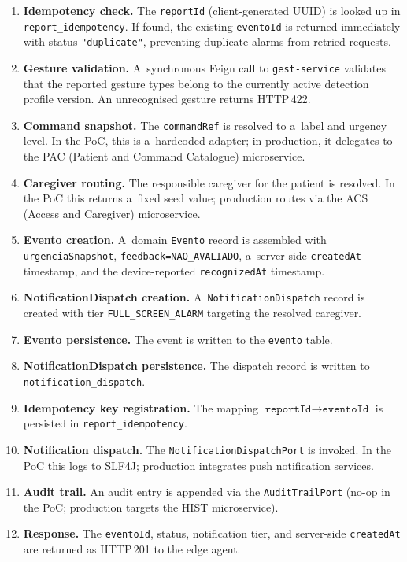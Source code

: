 \begin{enumerate}
  \item \textbf{Idempotency check.} The \texttt{reportId} (client-generated UUID) is
    looked up in \texttt{report\_idempotency}. If found, the existing \texttt{eventoId}
    is returned immediately with status \texttt{"duplicate"}, preventing duplicate alarms
    from retried requests.
  \item \textbf{Gesture validation.} A~synchronous Feign call to \texttt{gest-service}
    validates that the reported gesture types belong to the currently active detection
    profile version. An unrecognised gesture returns HTTP\,422.
  \item \textbf{Command snapshot.} The \texttt{commandRef} is resolved to a~label and
    urgency level. In the PoC, this is a~hardcoded adapter; in production, it delegates
    to the PAC (Patient and Command Catalogue) microservice.
  \item \textbf{Caregiver routing.} The responsible caregiver for the patient is
    resolved. In the PoC this returns a~fixed seed value; production routes via the ACS
    (Access and Caregiver) microservice.
  \item \textbf{Evento creation.} A~domain \texttt{Evento} record is assembled with
    \texttt{urgenciaSnapshot}, \texttt{feedback=NAO\_AVALIADO}, a~server-side
    \texttt{createdAt} timestamp, and the device-reported \texttt{recognizedAt}
    timestamp.
  \item \textbf{NotificationDispatch creation.} A~\texttt{NotificationDispatch} record
    is created with tier \texttt{FULL\_SCREEN\_ALARM} targeting the resolved caregiver.
  \item \textbf{Evento persistence.} The event is written to the \texttt{evento} table.
  \item \textbf{NotificationDispatch persistence.} The dispatch record is written to
    \texttt{notification\_dispatch}.
  \item \textbf{Idempotency key registration.} The mapping
    $\texttt{reportId} \to \texttt{eventoId}$ is persisted in
    \texttt{report\_idempotency}.
  \item \textbf{Notification dispatch.} The \texttt{NotificationDispatchPort} is
    invoked. In the PoC this logs to SLF4J; production integrates push notification
    services.
  \item \textbf{Audit trail.} An audit entry is appended via the
    \texttt{AuditTrailPort} (no-op in the PoC; production targets the HIST microservice).
  \item \textbf{Response.} The \texttt{eventoId}, status, notification tier, and
    server-side \texttt{createdAt} are returned as HTTP\,201 to the edge agent.
\end{enumerate}


